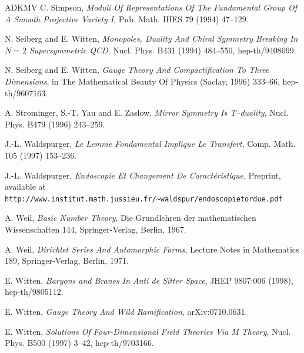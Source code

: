 \begin{thebibliography}{ADKMV}
 C. Simpson, \emph{Moduli Of Representations Of The Fundamental Group Of A Smooth Projective Variety I}, Pub. Math. IHES 79 (1994) 47--129.

 N. Seiberg and E. Witten, \emph{Monopoles, Duality And Chiral Symmetry Breaking In $N=2$ Supersymmetric QCD}, Nucl. Phys. B431 (1994) 484--550, hep-th/9408099.

 N. Seiberg and E. Witten, \emph{Gauge Theory And Compactification To Three Dimensions}, in The Mathematical Beauty Of Physics (Saclay, 1996) 333--66, hep-th/9607163.

 A. Strominger, S.-T. Yau and E. Zaslow, \emph{Mirror Symmetry Is T--duality}, Nucl. Phys. B479 (1996) 243--259.

 J.-L. Waldspurger, \emph{Le Lemme Fondamental Implique Le Transfert}, Comp. Math. 105 (1997) 153--236.

 J.-L. Waldspurger, \emph{Endoscopie Et Changement De Caract\'eristique}, Preprint, available at \texttt{http://www.institut.math.jussieu.fr/\textasciitilde waldspur/endoscopietordue.pdf}

 A. Weil, \emph{Basic Number Theory}, Die Grundlehren der mathematischen Wissenschaften 144, Springer-Verlag, Berlin, 1967.

 A. Weil, \emph{Dirichlet Series And Automorphic Forms}, Lecture Notes in Mathematics 189, Springer-Verlag, Berlin, 1971.

 E. Witten, \emph{Baryons and Branes In Anti de Sitter Space}, JHEP 9807:006 (1998), hep-th/9805112.

 E. Witten, \emph{Gauge Theory And Wild Ramification}, arXiv:0710.0631.

 E. Witten, \emph{Solutions Of Four-Dimensional Field Theories Via M Theory}, Nucl. Phys. B500 (1997) 3--42, hep-th/9703166.

\end{thebibliography}
